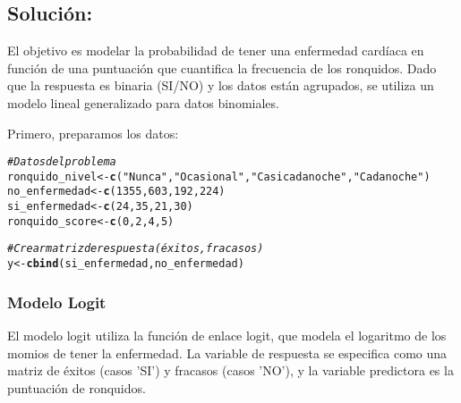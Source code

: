 \documentclass[paper=letter, fontsize=11pt]{scrartcl}\usepackage[]{graphicx}\usepackage[]{xcolor}
\makeatletter
\newcommand{\hlnum}[1]{\textcolor[rgb]{0.686,0.059,0.569}{#1}}%
\newcommand{\hlsng}[1]{\textcolor[rgb]{0.192,0.494,0.8}{#1}}%
\newcommand{\hlcom}[1]{\textcolor[rgb]{0.678,0.584,0.686}{\textit{#1}}}%
\newcommand{\hldef}[1]{\textcolor[rgb]{0.345,0.345,0.345}{#1}}%
\newcommand{\hlkwb}[1]{\textcolor[rgb]{0.69,0.353,0.396}{#1}}%
\newcommand{\hlkwd}[1]{\textcolor[rgb]{0.737,0.353,0.396}{\textbf{#1}}}%
\newenvironment{kframe}{%
 \def\at@end@of@kframe{}%
 \ifinner\ifhmode%
  \def\at@end@of@kframe{\end{minipage}}%
  \begin{minipage}{\columnwidth}%
 \fi\fi%
 \def\FrameCommand##1{\hskip\@totalleftmargin \hskip-\fboxsep
 \colorbox{shadecolor}{##1}\hskip-\fboxsep
     \hskip-\linewidth \hskip-\@totalleftmargin \hskip\columnwidth}%
 \MakeFramed {\advance\hsize-\width
   \@totalleftmargin\z@ \linewidth\hsize
   \@setminipage}}%
 {\par\unskip\endMakeFramed%
 \at@end@of@kframe}
\newenvironment{knitrout}{}{} %
\numberwithin{equation}{problemcounter} %
\numberwithin{figure}{problemcounter} %
\numberwithin{table}{problemcounter} %
\numberwithin{subsection}{problemcounter}
\makeatother
\begin{document}
\subsection{\textbf{Solución:}}

El objetivo es modelar la probabilidad de tener una enfermedad cardíaca en función de una puntuación que cuantifica la frecuencia de los ronquidos. Dado que la respuesta es binaria (SI/NO) y los datos están agrupados, se utiliza un modelo lineal generalizado para datos binomiales.

Primero, preparamos los datos:

\begin{knitrout}
\color{fgcolor}\begin{kframe}
\begin{alltt}
\hlcom{# Datos del problema}
\hldef{ronquido_nivel} \hlkwb{<-} \hlkwd{c}\hldef{(}\hlsng{"Nunca"}\hldef{,} \hlsng{"Ocasional"}\hldef{,} \hlsng{"Casi cada noche"}\hldef{,} \hlsng{"Cada noche"}\hldef{)}
\hldef{no_enfermedad} \hlkwb{<-} \hlkwd{c}\hldef{(}\hlnum{1355}\hldef{,} \hlnum{603}\hldef{,} \hlnum{192}\hldef{,} \hlnum{224}\hldef{)}
\hldef{si_enfermedad} \hlkwb{<-} \hlkwd{c}\hldef{(}\hlnum{24}\hldef{,} \hlnum{35}\hldef{,} \hlnum{21}\hldef{,} \hlnum{30}\hldef{)}
\hldef{ronquido_score} \hlkwb{<-} \hlkwd{c}\hldef{(}\hlnum{0}\hldef{,} \hlnum{2}\hldef{,} \hlnum{4}\hldef{,} \hlnum{5}\hldef{)}

\hlcom{# Crear matriz de respuesta (éxitos, fracasos)}
\hldef{y} \hlkwb{<-} \hlkwd{cbind}\hldef{(si_enfermedad, no_enfermedad)}
\end{alltt}
\end{kframe}
\end{knitrout}

\subsubsection*{Modelo Logit}

El modelo logit utiliza la función de enlace logit, que modela el logaritmo de los momios de tener la enfermedad. La variable de respuesta se especifica como una matriz de éxitos (casos 'SI') y fracasos (casos 'NO'), y la variable predictora es la puntuación de ronquidos.
\end{document}
